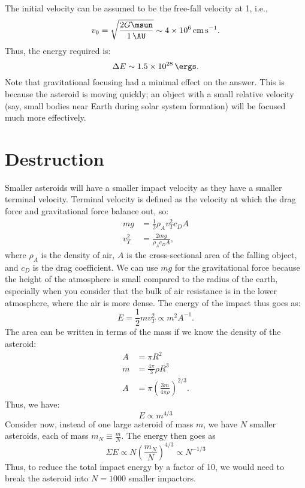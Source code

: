 \documentclass{article}
\begin{document}
        The initial velocity can be assumed to be the free-fall velocity at \SI{1}{\AU}, i.e.,
        \begin{equation}
                v_{0} = \sqrt{\frac{2G\si{\msun}}{\SI{1}{\AU}}} \sim \SI{4e6}{\cm\per\second}.
        \end{equation}
        Thus, the energy required is:
        \begin{equation}
                \Delta E \sim \SI{1.5e28}{\ergs}.
        \end{equation}
        Note that gravitational focusing had a minimal effect on the answer.  This is because the asteroid is moving quickly; an object with a small relative velocity (say, small bodies near Earth during solar system formation) will be focused much more effectively.
        
        \section{Destruction}
        Smaller asteroids will have a smaller impact velocity as they have a smaller terminal velocity.  Terminal velocity is defined as the velocity at which the drag force and gravitational force balance out, so:
        \begin{align}
                mg &= \frac{1}{2}\rho_{A} v_{T}^{2}c_{D}A\\
                v_{T}^{2} &= {\frac{2mg}{\rho_{A} c_{D}A}},
        \end{align}
        where $\rho_{A}$ is the density of air, $A$ is the cross-sectional area of the falling object, and $c_{D}$ is the drag coefficient.  We can use $mg$ for the gravitational force because the height of the atmosphere is small compared to the radius of the earth, especially when you consider that the bulk of air resistance is in the lower atmosphere, where the air is more dense. The energy of the impact thus goes as:
        \begin{equation}
                E = \frac{1}{2}mv_{T}^{2} \propto m^{2}A^{-1}.
        \end{equation}
        The area can be written in terms of the mass if we know the density of the asteroid:
        \begin{align}
                A &= \pi R^{2}\\
                m &= \frac{4\pi}{3}\rho R^{3}\\
                A &= \pi \left(\frac{3m}{4\pi\rho}\right)^{2/3}.
        \end{align}
        Thus, we have:
        \begin{equation}
                E\propto m^{4/3}
        \end{equation}
        Consider now, instead of one large asteroid of mass $m$, we have $N$ smaller asteroids, each of mass $m_{N}\equiv \frac{m}{N}$.  The energy then goes as
        \begin{equation}
                \Sigma{E} \propto N\left(\frac{m_{N}}{N}\right)^{4/3} \propto N^{-1/3}
        \end{equation}
        Thus, to reduce the total impact energy by a factor of 10, we would need to break the asteroid into $N=1000$ smaller impactors.
\end{document}
